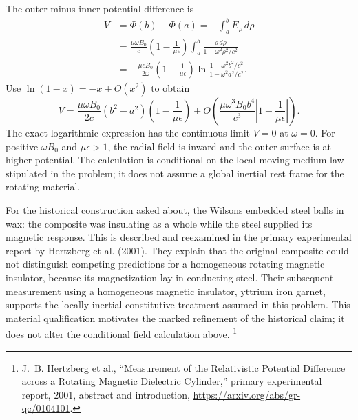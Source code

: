 The outer-minus-inner potential difference is
\begin{align*}
V&=\Phi(b)-\Phi(a)=-\int_a^bE_\rho\,d\rho\\
&=\frac{\mu\omega B_0}{c}\left(1-\frac1{\mu\epsilon}\right)
\int_a^b\frac{\rho\,d\rho}{1-\omega^2\rho^2/c^2}\\
&=\boxed{-\frac{\mu cB_0}{2\omega}
\left(1-\frac1{\mu\epsilon}\right)
\ln\frac{1-\omega^2b^2/c^2}{1-\omega^2a^2/c^2}.}
\end{align*}
Use $\ln(1-x)=-x+O(x^2)$ to obtain
\[
\boxed{V=\frac{\mu\omega B_0}{2c}(b^2-a^2)
\left(1-\frac1{\mu\epsilon}\right)
+O\!\left(\frac{\mu\omega^3B_0b^4}{c^3}
\left|1-\frac1{\mu\epsilon}\right|\right).}
\]
The exact logarithmic expression has the continuous limit $V=0$
at $\omega=0$. For positive $\omega B_0$ and $\mu\epsilon>1$,
the radial field is inward and the outer surface is at higher
potential. The calculation is conditional on the local moving-medium
law stipulated in the problem; it does not assume a global inertial
rest frame for the rotating material.

For the historical construction asked about, the Wilsons embedded
steel balls in wax: the composite was insulating as a whole while
the steel supplied its magnetic response. This is described and
reexamined in the primary experimental report by Hertzberg et al.
(2001). They explain that the original composite could not
distinguish competing predictions for a homogeneous rotating
magnetic insulator, because its magnetization lay in conducting
steel. Their subsequent measurement using a homogeneous magnetic
insulator, yttrium iron garnet, supports the locally inertial
constitutive treatment assumed in this problem. This material
qualification motivates the marked refinement of the historical
claim; it does not alter the conditional field calculation above.
\footnote{J.~B. Hertzberg et al., ``Measurement of the Relativistic
Potential Difference across a Rotating Magnetic Dielectric Cylinder,''
primary experimental report, 2001, abstract and introduction,
\url{https://arxiv.org/abs/gr-qc/0104101}.}

